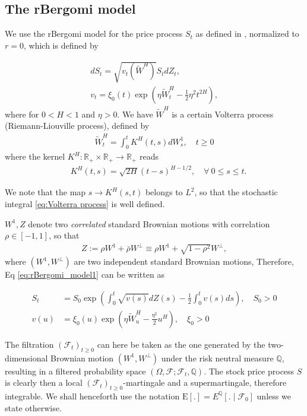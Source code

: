 \documentclass[11pt]{article}
\newcommand{\expt}[1]{\mathrm{E}\left[#1\right]}
\newcommand{\rset}{\mathbb{R}}
\begin{document}
\subsection{The rBergomi model}\label{sec:The rBergomi model}

We use  the rBergomi model for the price process $S_t$ as defined in  \cite{bayer2016pricing}, normalized to $r=0$, which is defined by

\begin{align}\label{eq:rBergomi_model1}
	dS_t = \sqrt{v_t(\tilde{W}^H)} S_t dZ_t,\\
	v_t = \xi_0(t) \exp\left( \eta \tilde{W}_t^H - \frac{1}{2} \eta^2 t^{2H} \right),
\end{align}
where for $0 < H < 1$ and  $\eta>0$.  We have $\tilde{W}^H $ is a certain Volterra process (Riemann-Liouville
process),  defined by
\begin{align}\label{eq:Volterra process}
	\tilde{W}_t^H = \int_0^t K^H(t,s) dW_s^1, \quad t \ge 0
\end{align}
where the kernel $K^H : \rset_+ \times \rset_+ \rightarrow \rset_+$ reads
\begin{align}
 \quad K^H(t,s) = \sqrt{2H} (t-s)^{H - 1/2},\quad \forall \: 0 \le s \le t.
\end{align}

We note that the map $s \rightarrow K^H(s,t)$ belongs to $L^2$, so
that the stochastic integral \eqref{eq:Volterra process} is well defined.

$W^1, Z$ denote two \emph{correlated} standard Brownian motions with correlation $\rho \in [-1,1]$, so that
\begin{align}
	Z:=\rho	W^1+ \bar{\rho}W^\perp \equiv \rho W^1+\sqrt{1-\rho^2} W^\perp,
\end{align}
where $(W^1,W^\perp)$ are two independent standard Brownian motions,
Therefore, Eq \ref{eq:rBergomi_model1} can be written as 

\begin{align}\label{eq:rBergomi_model}
	S_t&= S_0  \operatorname{exp}\left( \int_{0}^{t} \sqrt{v(s)} dZ(s)- \frac{1}{2} \int_{0}^{t} v(s) ds   \right),\quad S_0>0 \nonumber\\
	v(u)&=\xi_0(u) \operatorname{exp}\left( \eta \tilde{W}_u^H- \frac{\eta^2}{2} u^H \right), \quad \xi_0>0
\end{align}


The filtration $(\mathcal{F}_t)_{t\ge 0}$ can here be taken as the one generated by the two-dimensional Brownian motion $(W^1,W^\perp)$ under the risk neutral measure $\mathbb{Q}$, resulting in  a filtered probability space $(\Omega,\mathcal{F}; \mathcal{F}_t,\mathbb{Q})$. The stock price process $S$ is clearly then a local
$(\mathcal{F}_t)_{t\ge 0}$-martingale and a supermartingale, therefore integrable.  We shall henceforth use the notation $\expt{.} = E^{\mathbb{Q}}\left[. \mid \mathcal{F}_0\right]$ unless we state otherwise.
\end{document}
